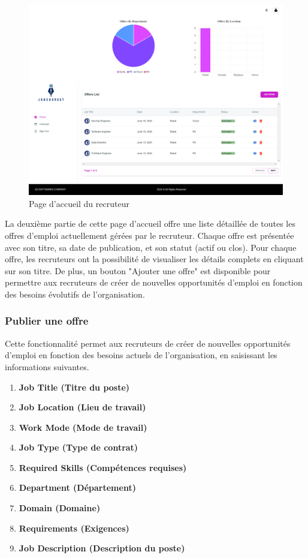 \begin{figure}[htbp]
   \centering
   \includegraphics[scale=0.2]{screens/homeRecr.png} 
   \caption{Page d'accueil du recruteur}
   \label{fig:homeRecr}
\end{figure}

La deuxième partie de cette page d'accueil offre une liste détaillée de toutes 
les offres d'emploi actuellement gérées par le recruteur. Chaque offre est 
présentée avec son titre, sa date de publication, et son statut (actif ou clos). 
Pour chaque offre, les recruteurs ont la possibilité de visualiser les détails 
complets en cliquant sur son titre. De plus, un bouton "Ajouter une offre" est 
disponible pour permettre aux recruteurs de créer de nouvelles opportunités 
d'emploi en fonction des besoins évolutifs de l'organisation.
\subsubsection{Publier une offre}

Cette fonctionnalité permet aux recruteurs de créer de nouvelles opportunités d'emploi en fonction des besoins actuels de l'organisation, en saisissant les informations suivantes.
\begin{enumerate}
   \item \textbf{Job Title (Titre du poste)}
   \item \textbf{Job Location (Lieu de travail)}
   \item \textbf{Work Mode (Mode de travail)}
   \item \textbf{Job Type (Type de contrat)}
   \item \textbf{Required Skills (Compétences requises)}
   \item \textbf{Department (Département)}
   \item \textbf{Domain (Domaine)}
   \item \textbf{Requirements (Exigences)}
   \item \textbf{Job Description (Description du poste)}
\end{enumerate}

